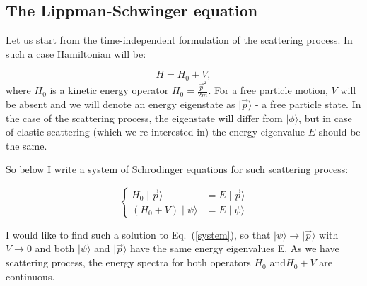 \subsection{The Lippman-Schwinger equation}




    Let us start from the time-independent formulation of the scattering process.
    In such a case Hamiltonian will be:

    \begin{equation}
        H = H_0 + V,
    \end{equation}
    where $H_0$ is a kinetic energy operator $H_0 = \frac{\vec{p}^2}{2m}$.
    For a free particle motion, $V$ will be absent and we will denote an energy eigenstate as
    $\mid \vec{p} \rangle$ - a free particle state.
    In the case of the scattering process, the eigenstate will differ from $\mid \phi \rangle$,
    but in case of elastic scattering (which we re interested in) the energy eigenvalue $E$ should be the same.

    So below I write a system of Schrodinger equations for such scattering process:

    \begin{equation}
        \begin{cases}
            H_0 \mid \vec{p} \rangle &= E \mid \vec{p} \rangle \\
            (H_0 + V) \mid \psi \rangle &= E \mid \psi \rangle
        \end{cases}
        \label{system}
    \end{equation}

    I would like to find such a solution to Eq.~(\ref{system}), so that 
    $\mid \psi \rangle \rightarrow \mid \vec{p} \rangle$ with $V \rightarrow 0$
    and both $\mid \psi \rangle$ and $\mid \vec{p} \rangle$ have the same energy eigenvalues E.
    As we have scattering process, the energy spectra for both operators $H_0$ and$H_0 + V$
    are continuous. 

